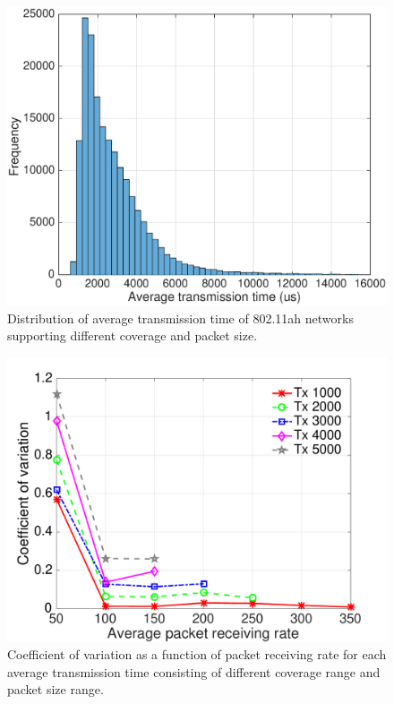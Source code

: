 
\begin{figure}[t]
  \centering
  \includegraphics[width=0.75\columnwidth]{figures/histTx}
  \caption{Distribution of average transmission time of 802.11ah networks supporting different coverage and packet size. \label{fig:tx-hist}}
\end{figure}




\begin{figure}[t]
  \centering
   \includegraphics[width=0.75\columnwidth]{figures/new_load_avg_result_Prate_tx.pdf}
    \caption{Coefficient of variation as a function of packet receiving rate for each average transmission time consisting of different coverage range and packet size range. \label{fig:tx-diff-Prate}}
\end{figure}


